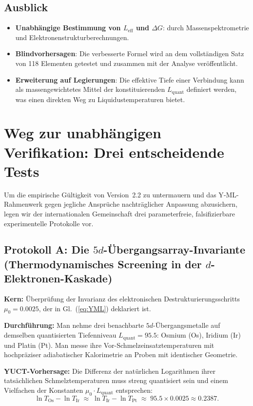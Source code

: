 \documentclass[12pt,a4paper]{article}
\theoremstyle{remark}
\begin{document}
	\subsection{Ausblick}
	\begin{itemize}
		\item \textbf{Unabhängige Bestimmung von \(L_{\mathrm{eff}}\) und \(\Delta G\)}: durch Massenspektrometrie und Elektronenstrukturberechnungen.
		\item \textbf{Blindvorhersagen}: Die verbesserte Formel wird an dem vollständigen Satz von 118 Elementen getestet und zusammen mit der Analyse veröffentlicht.
		\item \textbf{Erweiterung auf Legierungen}: Die effektive Tiefe einer Verbindung kann als massengewichtetes Mittel der konstituierenden \(L_{\mathrm{quant}}\) definiert werden, was einen direkten Weg zu Liquidustemperaturen bietet.
	\end{itemize}
	
	\section{Weg zur unabhängigen Verifikation: Drei entscheidende Tests}
	\label{sec:decisive_tests}
	
	Um die empirische Gültigkeit von Version~2.2 zu untermauern und das Y‑ML-Rahmenwerk gegen jegliche Ansprüche nachträglicher Anpassung abzusichern, legen wir der internationalen Gemeinschaft drei parameterfreie, falsifizierbare experimentelle Protokolle vor.
	
	\subsection{Protokoll A: Die $5d$-Übergangsarray-Invariante (Thermodynamisches Screening in der $d$-Elektronen-Kaskade)}
	\textbf{Kern:} Überprüfung der Invarianz des elektronischen Destrukturierungsschritts \(\mu_0 = 0.0025\), der in Gl.~(\ref{eq:YML}) deklariert ist.
	
	\textbf{Durchführung:} Man nehme drei benachbarte $5d$-Übergangsmetalle auf demselben quantisierten Tiefenniveau \(L_{\mathrm{quant}} = 95.5\): Osmium (Os), Iridium (Ir) und Platin (Pt). Man messe ihre Vor-Schmelzeinsatztemperaturen mit hochpräziser adiabatischer Kalorimetrie an Proben mit identischer Geometrie.
	
	\textbf{YUCT-Vorhersage:} Die Differenz der natürlichen Logarithmen ihrer tatsächlichen Schmelztemperaturen muss streng quantisiert sein und einem Vielfachen der Konstanten \(\mu_0 \cdot L_{\mathrm{quant}}\) entsprechen:
	\begin{equation}
		\ln T_{\mathrm{Os}} - \ln T_{\mathrm{Ir}} \;\approx\; \ln T_{\mathrm{Ir}} - \ln T_{\mathrm{Pt}} \;\approx\; 95.5 \times 0.0025 \approx 0.2387 .
	\end{equation}
	
\end{document}
